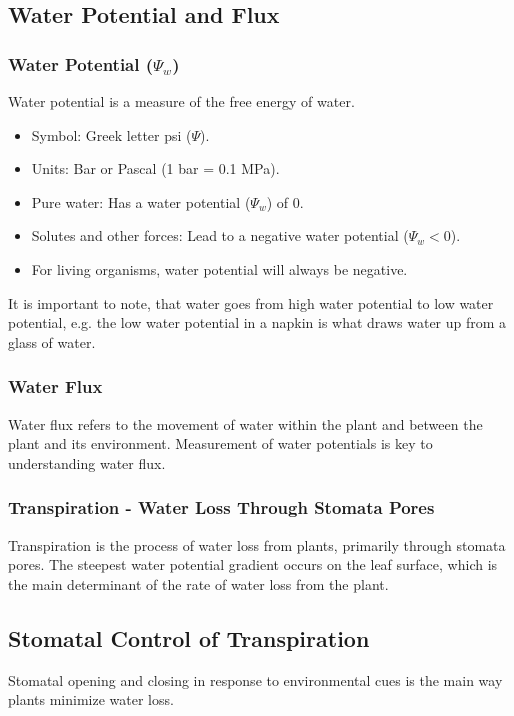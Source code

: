 \subsection{Water Potential and Flux} 
\subsubsection*{Water Potential ($\Psi_w$)} 
Water potential is a measure of the free energy of water. 
\begin{itemize} 
    \item Symbol: Greek letter psi ($\Psi$). 
    \item Units: Bar or Pascal (1 bar = 0.1 MPa). 
    \item Pure water: Has a water potential ($\Psi_w$) of 0. 
    \item Solutes and other forces: Lead to a negative water potential ($\Psi_w < 0$). 
    \item For living organisms, water potential will always be negative. 
\end{itemize}

\vspace*{1em}
It is important to note, that water goes from high water potential to low water potential, e.g. the low water potential in a napkin is what draws water up from a glass of water.

\subsubsection*{Water Flux} 
Water flux refers to the movement of water within the plant and between the plant and its environment. Measurement of water potentials is key to understanding water flux.

\subsubsection*{Transpiration - Water Loss Through Stomata Pores} 
Transpiration is the process of water loss from plants, primarily through stomata pores. The steepest water potential gradient occurs on the leaf surface, which is the main determinant of the rate of water loss from the plant.

\subsection{Stomatal Control of Transpiration} 
Stomatal opening and closing in response to environmental cues is the main way plants minimize water loss. 

